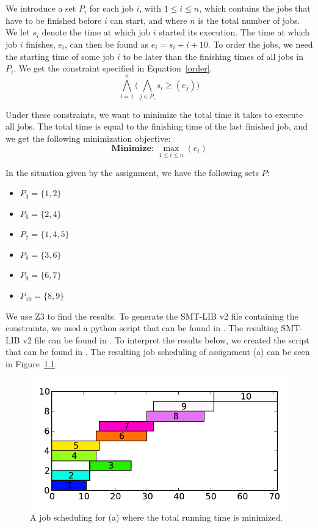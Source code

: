 \chapter{}\label{chp:3}
We introduce a set $P_i$ for each job $i$, with $1 \leq i \leq n$, which contains the jobs that have to be finished before $i$ can start, and where $n$ is the total number of jobs. We let $s_i$ denote the time at which job $i$ started its execution. The time at which job $i$ finishes, $e_i$, can then be found as $e_i = s_i + i + 10$. To order the jobs, we need the starting time of some job $i$ to be later than the finishing times of all jobs in $P_i$. We get the constraint specified in Equation~\ref{order}.
\begin{equation}
    \label{order}
    \bigwedge^{n}_{i=1}\big(\bigwedge_{j\in P_i} s_i \geq (e_j)\big)
\end{equation}

Under these constraints, we want to minimize the total time it takes to execute all jobs. The total time is equal to the finishing time of the last finished job, and we get the following minimization objective:
\begin{equation}
    \textbf{Minimize: }\max_{1\leq i \leq n}(e_i)
\end{equation}

In the situation given by the assignment, we have the following sets $P$:
\begin{itemize}
    \item $P_3 = \{1,2\}$
    \item $P_6 = \{2,4\}$
    \item $P_7 = \{1,4,5\}$
    \item $P_8 = \{3,6\}$
    \item $P_9 = \{6,7\}$
    \item $P_{10} = \{8,9\}$
\end{itemize}
We use Z3 to find the results. To generate the SMT-LIB v2 file containing the constraints, we used a python script that can be found in . The resulting SMT-LIB v2 file can be found in . To interpret the results below, we created the script that can be found in . The resulting job scheduling of assignment (a) can be seen in Figure~\ref{fig:3a}.
\begin{figure}[H]
    \centering
    \includegraphics[width=\columnwidth]{3/a.out.pdf}
    \caption{A job scheduling for (a) where the total running time is minimized.}
    \label{fig:3a}
\end{figure}

